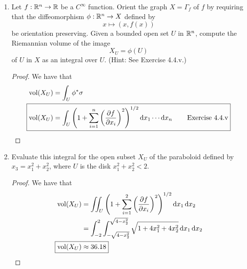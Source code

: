 \documentclass[../psets.tex]{subfiles}
\begin{document}
\begin{enumerate}[label={\textbf{4.5.\roman*.}}]
    \item Let $f:\mathbb{R}^n\to\mathbb{R}$ be a $C^\infty$ function. Orient the graph $X=\Gamma_f$ of $f$ by requiring that the diffeomorphism $\phi:\mathbb{R}^n\to X$ defined by
    \begin{equation*}
        x \mapsto (x,f(x))
    \end{equation*}
    be orientation preserving. Given a bounded open set $U$ in $\mathbb{R}^n$, compute the Riemannian volume of the image
    \begin{equation*}
        X_U = \phi(U)
    \end{equation*}
    of $U$ in $X$ as an integral over $U$. (Hint: See Exercise 4.4.v.)
    \begin{proof}
        We have that
        \begin{align*}
            \vol(X_U) &= \int_U\phi^*\sigma\\
            \Aboxed{\vol(X_U) &= \int_U\left( 1+\sum_{i=1}^n\left( \pdv{f}{x_i} \right)^2 \right)^{1/2}\dd{x_1}\cdots\dd{x_n}\tag*{Exercise 4.4.v}}
        \end{align*}
    \end{proof}
    \item Evaluate this integral for the open subset $X_U$ of the paraboloid defined by $x_3=x_1^2+x_2^2$, where $U$ is the disk $x_1^2+x_2^2<2$.
    \begin{proof}
        We have that
        \begin{align*}
            \vol(X_U) &= \iint_U\left( 1+\sum_{i=1}^2\left( \pdv{f}{x_i} \right)^2 \right)^{1/2}\dd{x_1}\dd{x_2}\\
            &= \int_{-2}^2\int_{-\sqrt{4-x_2^2}}^{\sqrt{4-x_2^2}}\sqrt{1+4x_1^2+4x_2^2}\dd{x_1}\dd{x_2}\\
            \Aboxed{\vol(X_U) &\approx 36.18}
        \end{align*}
    \end{proof}
\end{enumerate}
\end{document}
